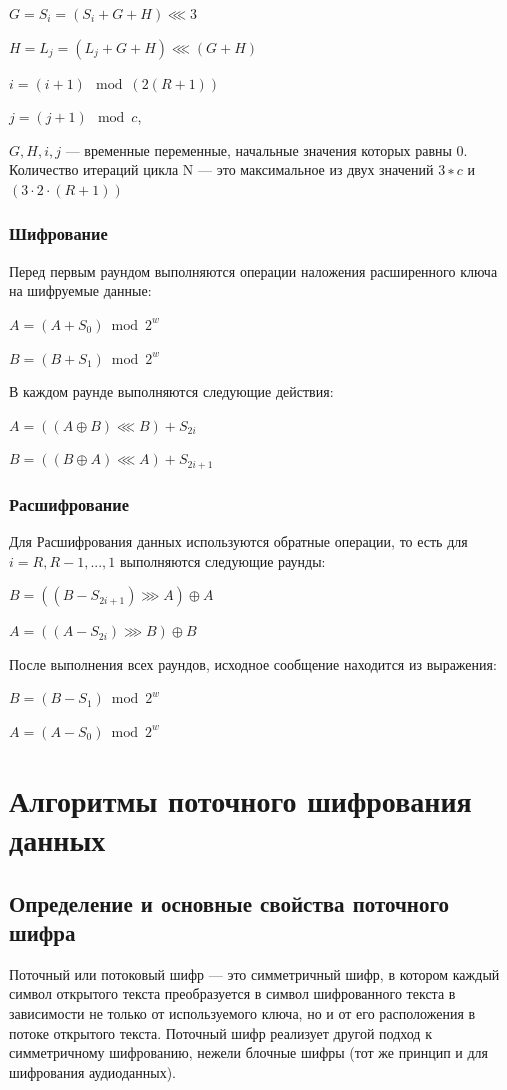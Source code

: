 \documentclass[a4paper]{report}
\begin{document}
${\displaystyle G=S_{i}=(S_{i}+G+H)\lll 3}$

${\displaystyle H=L_{j}=(L_{j}+G+H)\lll (G+H)}$

${\displaystyle i=(i+1)\mod (2(R+1))}$

${\displaystyle j=(j+1)\mod c}$,

$G, H, i, j$ — временные переменные, начальные значения которых равны 0. Количество итераций цикла N — это максимальное из двух значений $3 ∗ c$ и $(3 \cdot 2 \cdot (R + 1))$ 

\subsubsection{Шифрование}
Перед первым раундом выполняются операции наложения расширенного ключа на шифруемые данные:

$A=(A+S_0) \bmod {2^{w}}$

$B=(B+S_1)\bmod {2^{w}}$

В каждом раунде выполняются следующие действия: 

$A=((A\oplus B)\lll B)+S_{2i}$

$B=((B\oplus A)\lll A)+S_{2i+1}$

\subsubsection{Расшифрование}

Для Расшифрования данных используются обратные операции, то есть для $i = R, R − 1,...,1$ выполняются следующие раунды:

$B=((B-S_{2i+1})\ggg A)\oplus A$

$A=((A-S_{2i})\ggg B)\oplus B$

После выполнения всех раундов, исходное сообщение находится из выражения: 

$B=(B-S_1)\bmod {2^{w}}$

$A=(A-S_0)\bmod {2^{w}}$


\section{Алгоритмы поточного шифрования данных}
\subsection{Определение и основные свойства поточного шифра}
Поточный или потоковый шифр — это симметричный шифр, в котором каждый символ открытого текста преобразуется в символ шифрованного текста в зависимости не только от используемого ключа, но и от его расположения в потоке открытого текста. Поточный шифр реализует другой подход к симметричному шифрованию, нежели блочные шифры (тот же принцип и для шифрования аудиоданных).
\end{document}
